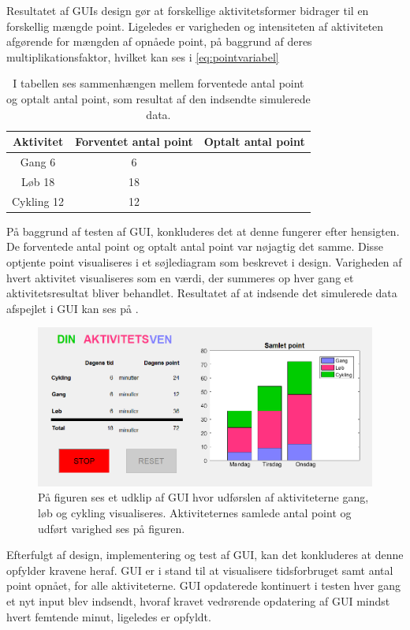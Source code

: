 Resultatet af GUIs design gør at forskellige aktivitetsformer bidrager til en forskellig mængde point. Ligeledes er varigheden og intensiteten  af aktiviteten afgørende for mængden af opnåede point, på baggrund af deres multiplikationsfaktor, hvilket kan ses i \eqref{eq:pointvariabel}
\begin{table}[H]
	\centering
	\begin{tabular}{ccc}
		\hline
		\rowcolor[HTML]{C0C0C0} 
		Aktivitet 	& Forventet antal point & Optalt antal point \\ \hline
		Gang 	  6 & 6	 \\ \hline
		Løb 	 18 & 18 \\ \hline
		Cykling  12 & 12 \\ \hline
	\end{tabular}
	\caption{I tabellen ses sammenhængen mellem forventede antal point og optalt antal point, som resultat af den indsendte simulerede data.}
	\label{test:GUI}
\end{table}\vspace{-.5cm}
På baggrund af testen af GUI, konkluderes det at denne fungerer efter hensigten. De forventede antal point og optalt antal point var nøjagtig det samme. Disse optjente point visualiseres i et søjlediagram som beskrevet i design. Varigheden af hvert aktivitet visualiseres som en værdi, der summeres op hver gang et aktivitetsresultat bliver behandlet. Resultatet af at indsende det simulerede data afspejlet i GUI kan ses på .

\begin{figure}[H]
	\centering
	\includegraphics[scale=0.7]{figures/cDesign/test_GUI.png}
	\caption{På figuren ses et udklip af GUI hvor udførslen af aktiviteterne gang, løb og cykling visualiseres. Aktiviteternes samlede antal point og udført varighed ses på figuren.}
	\label{fig:GUI2}
\end{figure}

Efterfulgt af design, implementering og test af GUI, kan det konkluderes at denne opfylder kravene heraf. GUI er i stand til at visualisere tidsforbruget samt antal point opnået, for alle aktiviteterne. GUI opdaterede kontinuert i testen hver gang et nyt input blev indsendt, hvoraf kravet vedrørende opdatering af GUI mindst hvert femtende minut, ligeledes er opfyldt.